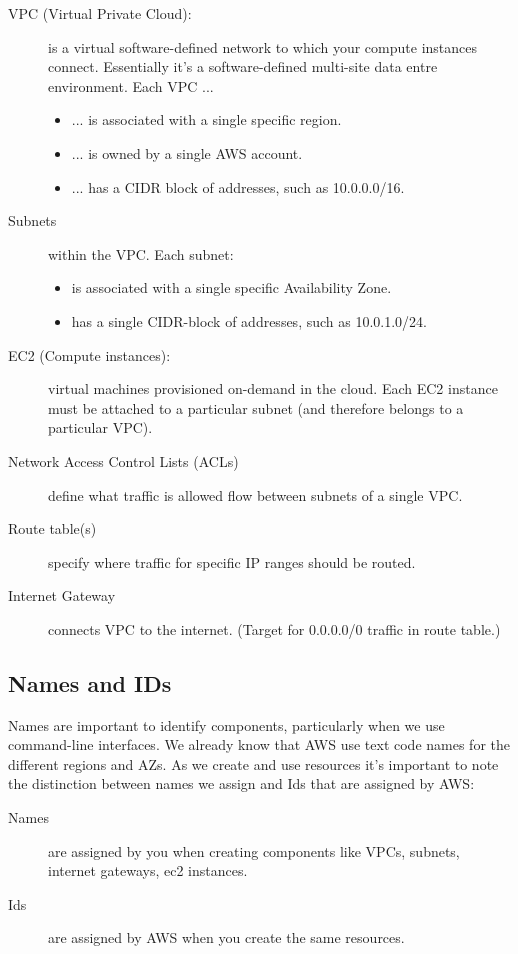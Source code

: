 \documentclass{pgnotes}
\begin{document}
\begin{description}
\item[VPC (Virtual Private Cloud):] is a virtual software-defined network to which your compute instances connect. Essentially it's a software-defined multi-site data entre environment.  Each VPC ... 
  \begin{itemize}
  \item ... is associated with a single specific region.
  \item ... is owned by a single AWS account.
  \item ... has a CIDR block of addresses, such as 10.0.0.0/16.
  \end{itemize}
\item[Subnets] within the VPC. Each subnet:
  \begin{itemize}
  \item is associated with a single specific Availability Zone.
  \item has a single CIDR-block of addresses, such as 10.0.1.0/24.
  \end{itemize}
\item[EC2 (Compute instances):] virtual machines provisioned on-demand in the cloud.  Each EC2 instance must be attached to a particular subnet (and therefore belongs to a particular VPC).
\item[Network Access Control Lists (ACLs)] define what traffic is allowed flow between subnets of a single VPC.
\item[Route table(s)] specify where traffic for specific IP ranges should be routed.
\item[Internet Gateway] connects VPC to the internet. (Target for 0.0.0.0/0 traffic in route table.)
\end{description}


\subsection{Names and IDs}

Names are important to identify components, particularly when we use command-line interfaces.
We already know that AWS use text code names for the different regions and AZs. 
As we create and use resources it's important to note the distinction between names we assign and Ids that are assigned by AWS:

\begin{description}
\item[Names] are assigned by you when creating components like VPCs, subnets, internet gateways, ec2 instances.
\item[Ids] are assigned by AWS when you create the same resources.
\end{description}
\end{document}
